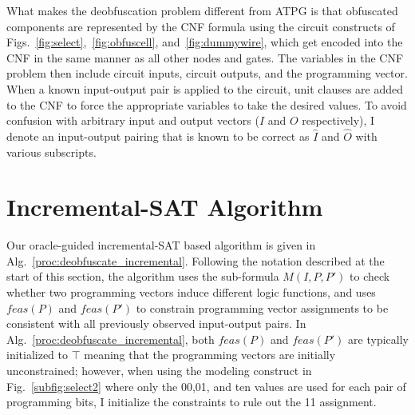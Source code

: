 \documentclass[proposal]{umassthesis}  %
\begin{document}
What makes the deobfuscation problem different from ATPG is that obfuscated components are represented by the CNF formula using the circuit constructs of Figs.~\ref{fig:select},~\ref{fig:obfuscell}, and~\ref{fig:dummywire}, which get encoded into the CNF in the same manner as all other nodes and gates. The variables in the CNF problem then include circuit inputs, circuit outputs, and the programming vector. When a known input-output pair is applied to the circuit, unit clauses are added to the CNF to force the appropriate variables to take the desired values. To avoid confusion {with arbitrary input and output vectors ($I$ and $O$ respectively)}, I denote an input-output pairing that is known to be correct as $\widehat{I}$ and $\widehat{O}$ with various subscripts. 
















\section{Incremental-SAT Algorithm}

Our oracle-guided incremental-SAT based algorithm is given in Alg.~\ref{proc:deobfuscate_incremental}. Following the notation described at the start of this section, the algorithm uses the sub-formula $M(I,P,P')$ to check whether two programming vectors induce different logic functions, and uses $feas(P)$ and $feas(P')$ to constrain programming vector assignments to be consistent with all previously observed input-output pairs. {In Alg.~\ref{proc:deobfuscate_incremental}, both $feas(P)$ and $feas(P')$ are typically initialized to $\top$ meaning that the programming vectors are initially unconstrained; however, when using the modeling construct in Fig.~\ref{subfig:select2} where only the 00,01, and ten values are used for each pair of programming bits, I initialize the constraints to rule out the 11 assignment.}
\end{document}
